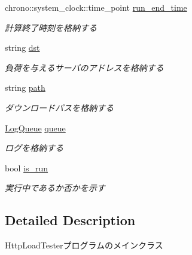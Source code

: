 \begin{DoxyCompactItemize}
\mbox{\label{class_session_a4d53e3a1a06099694e94b51d448b94a4}} 
chrono\+::system\+\_\+clock\+::time\+\_\+point \mbox{\hyperlink{class_session_a4d53e3a1a06099694e94b51d448b94a4}{run\+\_\+end\+\_\+time}}
\begin{DoxyCompactList}\small\item\em 計算終了時刻を格納する \end{DoxyCompactList}\item 
\mbox{\label{class_session_a6d1ea15ced9736aa0ee7752300e430ea}} 
string \mbox{\hyperlink{class_session_a6d1ea15ced9736aa0ee7752300e430ea}{dst}}
\begin{DoxyCompactList}\small\item\em 負荷を与えるサーバのアドレスを格納する \end{DoxyCompactList}\item 
\mbox{\label{class_session_ae26e301fcbf0c2d4717c3e9c28624fc7}} 
string \mbox{\hyperlink{class_session_ae26e301fcbf0c2d4717c3e9c28624fc7}{path}}
\begin{DoxyCompactList}\small\item\em ダウンロードパスを格納する \end{DoxyCompactList}\item 
\mbox{\label{class_session_a047c4dca57751816ffa8d2163bb967d1}} 
\mbox{\hyperlink{class_log_queue}{Log\+Queue}} \mbox{\hyperlink{class_session_a047c4dca57751816ffa8d2163bb967d1}{queue}}
\begin{DoxyCompactList}\small\item\em ログを格納する \end{DoxyCompactList}\item 
\mbox{\label{class_session_aef8d58138baac878a24d20294c5fe64f}} 
bool \mbox{\hyperlink{class_session_aef8d58138baac878a24d20294c5fe64f}{is\+\_\+run}}
\begin{DoxyCompactList}\small\item\em 実行中であるか否かを示す \end{DoxyCompactList}\end{DoxyCompactItemize}


\subsection{Detailed Description}
Http\+Load\+Testerプログラムのメインクラス 



